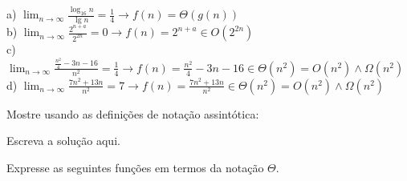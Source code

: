 \documentclass[a4paper]{exam}
\begin{document}
\begin{questions}
  \begin{solution}
    a) $\displaystyle\lim_{n\to\infty} \frac{\log_{16} n}{\lg n} = \frac{1}{4} \to f(n) = \Theta(g(n))$ \\
    b) $\displaystyle\lim_{n\to\infty} \frac{2^{n+a}}{2^{2n}} = 0 \to f(n) = 2^{n+a} \in O(2^{2n})$ \\
    c) $\displaystyle\lim_{n\to\infty} \frac{\frac{n^2}{4} -3n - 16}{n^2} = \frac{1}{4} \to f(n) = \frac{n^2}{4} -3n - 16 
        \in \Theta(n^2) =  O(n^2) \land  \Omega(n^2)$ \\
    d) $\displaystyle\lim_{n\to\infty} \frac{7n^2 +13n}{n^2} = 7 \to f(n) = \frac{7n^2 +13n}{n^2}
        \in \Theta(n^2) =  O(n^2) \land  \Omega(n^2)$
  \end{solution}
  \question Mostre usando as definições de notação assintótica:
  \begin{solution}
    Escreva a solução aqui.
  \end{solution}
  \question Expresse as seguintes funções em termos da notação $\Theta$.
  \begin{parts}

\end{parts}
\end{questions}
\end{document}
